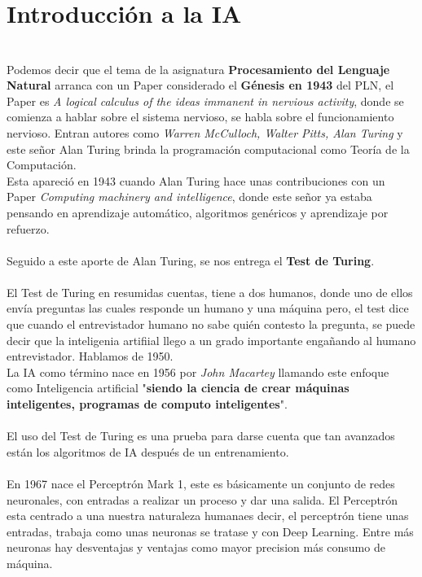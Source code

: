 \documentclass[a4paper]{report} %
\begin{document}
        \section{Introducción a la IA}
          \paragraph{}\mbox{} \\
            Podemos decir que el tema de la asignatura \textbf{Procesamiento del Lenguaje Natural} arranca con un Paper considerado el \textbf{Génesis en 1943} del PLN, el Paper es \textit{A logical calculus of the ideas immanent in nervious activity}, donde se comienza a hablar sobre el sistema nervioso, se habla sobre el funcionamiento nervioso. Entran autores como \textit{Warren McCulloch, Walter Pitts, Alan Turing} y este señor Alan Turing brinda la programación computacional como Teoría de la Computación.
            \\Esta apareció en 1943 cuando Alan Turing hace unas contribuciones con un Paper \textit{Computing machinery and intelligence}, donde este señor ya estaba pensando en aprendizaje automático, algoritmos genéricos y aprendizaje por refuerzo.
            \\\\Seguido a este aporte de Alan Turing, se nos entrega el \textbf{Test de Turing}.
            \\\\El Test de Turing en resumidas cuentas, tiene a dos humanos, donde uno de ellos envía preguntas las cuales responde un humano y una máquina pero, el test dice que cuando el entrevistador humano no sabe quién contesto la pregunta, se puede decir que la inteligenia artifiial llego a un grado importante engañando al humano entrevistador. Hablamos de 1950.
            \\La IA como término nace en 1956 por \textit{John Macartey} llamando este enfoque como Inteligencia artificial "\textbf{siendo la ciencia de crear máquinas inteligentes, programas de computo inteligentes}".
            \\\\El uso del Test de Turing es una prueba para darse cuenta que tan avanzados están los algoritmos de IA después de un entrenamiento.
            \\\\En 1967 nace el Perceptrón Mark 1, este es básicamente un conjunto de redes neuronales, con entradas a realizar un proceso y dar una salida. El Perceptrón esta centrado a una nuestra naturaleza humanaes decir, el perceptrón tiene unas entradas, trabaja como unas neuronas se tratase y con Deep Learning. Entre más neuronas hay desventajas y ventajas como mayor precision más consumo de máquina.
\end{document}
